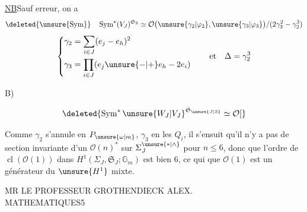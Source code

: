 \uline{NB}\quad Sauf erreur, on a
\[
\deleted{\unsure{\operatorname{Sym}}}\quad
\operatorname{Sym}^{*}(V_J)^{\mathfrak S_3}\simeq
\mathcal O\bigl(\unsure{\gamma_2|\varphi_2},\unsure{\gamma_3|\varphi_3}\bigr)
/(2\gamma_3^2-\gamma_2^3)
\]
\[
\left\{\begin{aligned}
\gamma_2&=\sum_{i\in J}(e_j-e_h)^2\\
\gamma_3&=\prod_{i\in J}(e_j\unsure{-|+}e_h-2e_i)
\end{aligned}\right.
\qquad\text{et}\quad\Delta=\gamma_2^3
\]


B)

\[
\deleted{\operatorname{Sym}^{*}\unsure{W_J|V_J}^{\mathfrak S_{\unsure{J|3}}}\simeq\mathcal O[}
\]

Comme $\gamma_2$ s'annule en  $P_{\unsure{\omega|m}}$,
$\gamma_3$ en les $Q_i$, il s'ensuit qu'il n'y a pas de section invariante
d'un $\mathcal O(n)^*$  sur
$\Sigma_J^{\unsure{*|\wedge}}$ 
pour $n\le6$, donc que l'ordre de
$\operatorname{cl}(\mathcal O(1))$ dans
$H^1(\Sigma_J,\mathfrak S_J;\mathbb G_m)$ est bien $6$,
ce qui  que $\mathcal O(1)$ est un générateur du
$\unsure{H^1}$ mixte.

\begin{flushleft}
MR LE PROFESSEUR GROTHENDIECK ALEX.\\
MATHEMATIQUES\hfill 5
\end{flushleft}



